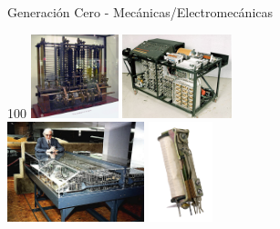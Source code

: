 \documentclass[aspectratio=169]{beamer}
\begin{document}
\begin{frame}[fragile,t]{Generación Cero - Mecánicas/Electromecánicas}
\begin{textblock}{100}
    \vspace{0.1cm}
    \includegraphics[height=2.44cm]{img/AnalyticalMachine_Babbage_London.jpg} \hspace{0.1cm} \includegraphics[height=2.44cm]{img/Atanasoff.jpg}\\
    \vspace{0.1cm}
    \includegraphics[height=2.9cm]{img/zuse.jpg} \hspace{0.1cm} \includegraphics[height=2.9cm]{img/rele.jpg}\\
    \end{textblock}
\end{frame}
\end{document}
